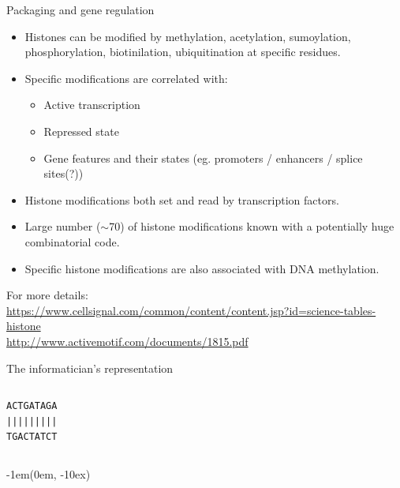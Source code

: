 \documentclass[pdf]{beamer}
\begin{document}
\begin{frame}{Packaging and gene regulation}
  \begin{itemize}
  \item Histones can be modified by methylation, acetylation, sumoylation,
    phosphorylation, biotinilation, ubiquitination at specific
    residues.
  \item Specific modifications are correlated with:
    \begin{itemize}
    \item Active transcription
    \item Repressed state
    \item Gene features and their states (eg. promoters / enhancers / splice
      sites(?))
    \end{itemize}
  \item Histone modifications both set and read by transcription factors.
  \item Large number ($\sim$70) of histone modifications known with a
    potentially huge combinatorial code.
  \item Specific histone modifications are also associated with DNA methylation.
  \end{itemize}
  {\tiny For more details:\\
    \url{https://www.cellsignal.com/common/content/content.jsp?id=science-tables-histone}\\
    \url{http://www.activemotif.com/documents/1815.pdf}\\
  }
\end{frame}




\begin{frame}[fragile]{The informatician's representation}
  \begin{columns}
    \begin{column}{0.5\textwidth}
       \begin{verbatim}
ACTGATAGA
|||||||||
TGACTATCT
       \end{verbatim}
    \end{column}
    \begin{column}{0.5\textwidth}
    \end{column}
  \end{columns}
  \begin{textblock*}{\textwidth-1em}(0em, \textheight-10ex)
    \raggedleft
  \end{textblock*}  
\end{frame}
\end{document}
